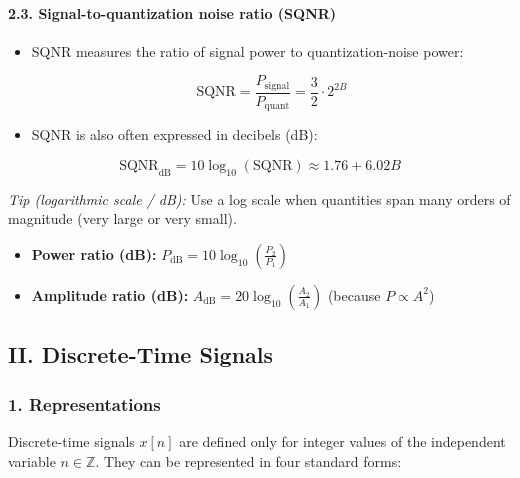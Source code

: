 \paragraph{2.3. Signal-to-quantization noise ratio
(SQNR)}\label{signal-to-quantization-noise-ratio-sqnr}

\begin{itemize}
\item
  SQNR measures the ratio of signal power to quantization-noise power:

  \[  
    \text{SQNR}=\frac{P_{\text{signal}}}{P_{\text{quant}}}=\frac{3}{2}\cdot 2^{2B}  
    \]
\item
  SQNR is also often expressed in decibels (dB):
\end{itemize}

\[  
\text{SQNR}_{\text{dB}}=10\log_{10}(\text{SQNR}) \approx 1.76 + 6.02B  
\]

\emph{Tip (logarithmic scale / dB):} Use a log scale when quantities
span many orders of magnitude (very large or very small).

\begin{itemize}
\tightlist
\item
  \textbf{Power ratio (dB):}
  \(P_{\mathrm{dB}} = 10\log_{10}\!\left(\frac{P_2}{P_1}\right)\)
\item
  \textbf{Amplitude ratio (dB):}
  \(A_{\mathrm{dB}} = 20\log_{10}\!\left(\frac{A_2}{A_1}\right)\)
  (because \(P \propto A^2\))
\end{itemize}

\subsection{II. Discrete-Time Signals}\label{ii.-discrete-time-signals}

\subsubsection{1. Representations}\label{representations}

Discrete-time signals \(x[n]\) are defined only for integer values of
the independent variable \(n \in \mathbb{Z}\). They can be represented
in four standard forms:

